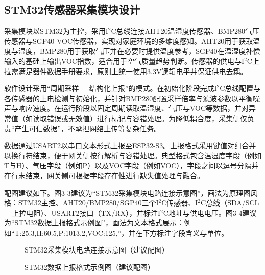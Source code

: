 \subsection{STM32传感器采集模块设计}
\par 采集模块以STM32为主控，采用I\(^2\)C总线连接AHT20温湿度传感器、BMP280气压传感器与SGP40 VOC传感器，实现对家庭环境的多维度感知。AHT20用于获取温度与湿度，BMP280用于获取气压并在必要时提供温度参考，SGP40在温湿度补偿输入的基础上输出VOC指数，适合用于空气质量趋势判断。传感器的供电与I\(^2\)C上拉需满足器件数据手册要求，原则上统一使用3.3V逻辑电平并保证供电去耦。
\par 软件设计采用“周期采样 + 结构化上报”的模式。在初始化阶段完成I\(^2\)C总线配置与各传感器的上电检测与初始化，并针对BMP280配置采样倍率与滤波参数以平衡噪声与响应速度。在运行阶段以固定周期读取温湿度、气压与VOC等数据，并对异常值（如读取错误或无效值）进行标记与容错处理。为降低耦合度，采集侧仅负责“产生可信数据”，不承担网络上传等复杂任务。
\par 数据通过USART2以串口文本形式上报至ESP32-S3。上报格式采用键值对组合并以换行符结束，便于网关侧按行解析与容错处理。典型格式包含温湿度字段（例如T与H）、气压字段（例如P）以及VOC字段（例如VOC），字段之间以逗号分隔并在行末结束，网关侧可根据字段存在性进行缺失值处理与融合。

\par 配图建议如下。图3-3建议为“STM32采集模块电路连接示意图”，画法为原理图风格：STM32主控、AHT20/BMP280/SGP40三个I\(^2\)C传感器、I\(^2\)C总线（SDA/SCL + 上拉电阻）、USART2接口（TX/RX），并标注I\(^2\)C地址与供电电压。图3-4建议为“STM32数据上报格式示例图”，画法为文本格式展示：例如“T:25.3,H:60.5,P:1013.2,VOC:125,”，并在下方标注字段含义与单位。
\begin{figure}[H]
\centering
{}
\caption{STM32采集模块电路连接示意图（建议配图）}
\label{fig:stm32_circuit}
\end{figure}
\begin{figure}[H]
\centering
{}
\caption{STM32数据上报格式示例图（建议配图）}
\label{fig:stm32_data_format}
\end{figure}

